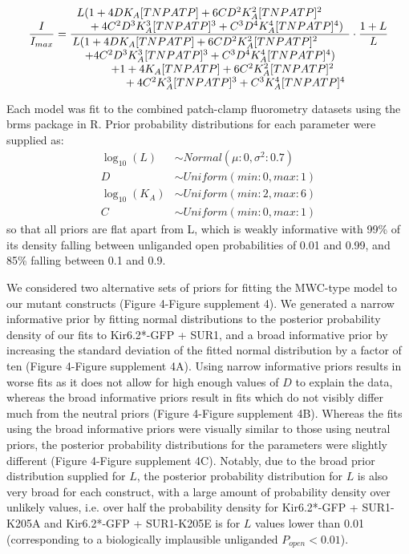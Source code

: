 \documentclass[10pt,lineno, doublespacing]{elife}
\begin{document}
\begin{equation} \label{eq:gating_3}
\frac{I}{I_{max}} = \frac{\splitfrac
    {L(1+4DK_A[TNPATP]+6CD^2K_A^2[TNPATP]^2}
    {+4C^2D^3K_A^3[TNPATP]^3+C^3D^4K_A^4[TNPATP]^4)}}{\splitfrac
    {L(1+4DK_A[TNPATP]+6CD^2K_A^2[TNPATP]^2}{\splitfrac
    {+4C^2D^3K_A^3[TNPATP]^3+C^3D^4K_A^4[TNPATP]^4)}{\splitfrac
    {+1+4K_A[TNPATP]+6C^2K_A^2[TNPATP]^2}
    {+4C^2K_A^3[TNPATP]^3+C^3K_A^4[TNPATP]^4}}}}\cdot
   \frac
    {1+L}
    {L}
\end{equation}

Each model was fit to the combined patch-clamp fluorometry datasets using the brms package \citep{RN109, RN108} in R.
Prior probability distributions for each parameter were supplied as:
\begin{equation} \label{eq:priors}
\begin{aligned}
\log_{10}(L) &\sim Normal(\mu: 0, \sigma^2: 0.7) \\
D &\sim Uniform(min: 0, max: 1) \\
\log_{10}(K_A) &\sim Uniform(min: 2, max: 6) \\
C &\sim Uniform(min: 0, max: 1)
\end{aligned}
\end{equation}
so that all priors are flat apart from L, which is weakly informative with 99\% of its density falling between unliganded open probabilities of 0.01 and 0.99, and 85\% falling between 0.1 and 0.9.

We considered two alternative sets of priors for fitting the MWC-type model to our mutant constructs (Figure 4-Figure supplement 4).
We generated a narrow informative prior by fitting normal distributions to the posterior probability density of our fits to Kir6.2*-GFP + SUR1, and a broad informative prior by increasing the standard deviation of the fitted normal distribution by a factor of ten (Figure 4-Figure supplement 4A).
Using narrow informative priors results in worse fits as it does not allow for high enough values of $D$ to explain the data, whereas the broad informative priors result in fits which do not visibly differ much from the neutral priors (Figure 4-Figure supplement 4B).
Whereas the fits using the broad informative priors were visually similar to those using neutral priors, the posterior probability distributions for the parameters were slightly different (Figure 4-Figure supplement 4C).
Notably, due to the broad prior distribution supplied for $L$, the posterior probability distribution for $L$ is also very broad for each construct, with a large amount of probability density over unlikely values, i.e. over half the probability density for Kir6.2*-GFP + SUR1-K205A and Kir6.2*-GFP + SUR1-K205E is for $L$ values lower than 0.01 (corresponding to a biologically implausible unliganded $P_{open} < 0.01$).
\end{document}
